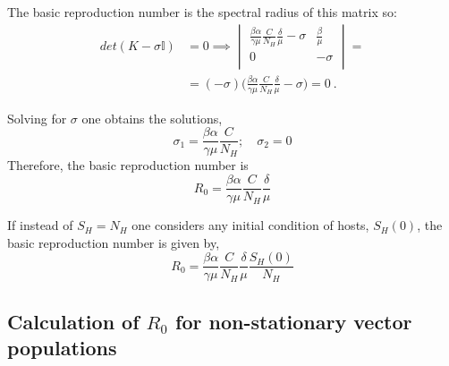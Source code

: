 The basic reproduction number is the spectral radius of this
matrix so:
\begin{equation*}
    \begin{aligned}
        det(K-\sigma\mathbb{I}) & = 0 \implies
        \begin{vmatrix}
            \frac{\beta \alpha}{\gamma
            \mu}\frac{C}{N_H}\frac{\delta}{\mu} -\sigma & \frac{\beta}{\mu } \\
            0                                           & -\sigma            \\
        \end{vmatrix} = \\
                                        & = (-\sigma)\bigg(\frac{\beta
            \alpha}{\gamma
            \mu}\frac{C}{N_H}\frac{\delta}{\mu} -\sigma\bigg)  =0 \ .
    \end{aligned}
\end{equation*}

Solving for $\sigma$ one obtains the solutions,
\begin{equation}
    \sigma_1 = \frac{\beta \alpha}{\gamma
        \mu}\frac{C}{N_H}; \quad \sigma_2 = 0
\end{equation}
Therefore, the basic reproduction number is
\begin{equation}
    R_0 = \frac{\beta \alpha}{\gamma
        \mu}\frac{C}{N_H}\frac{\delta}{\mu}
\end{equation}

If instead of $S_H=N_H$ one considers any initial condition of hosts,
$S_H(0)$, the basic reproduction number is given by,
\begin{equation}
    R_0 = \frac{\beta \alpha}{\gamma
        \mu}\frac{C}{N_H}\frac{\delta}{\mu}\frac{S_H(0)}{N_H}
\end{equation}

\subsection{Calculation of $R_0$ for non-stationary vector populations}
\label{app:R0_non_stationary}

